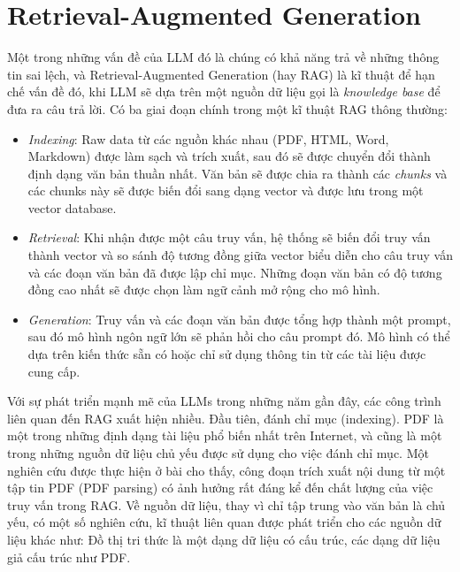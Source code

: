 \section{Retrieval-Augmented Generation}
Một trong những vấn đề của LLM đó là chúng có khả năng trả về những thông tin sai lệch, và
Retrieval-Augmented Generation (hay RAG) là kĩ thuật để hạn chế vấn đề đó, khi LLM sẽ dựa trên một nguồn dữ liệu gọi là \emph{knowledge base} để đưa ra câu trả lời. Có ba giai đoạn chính trong một kĩ thuật RAG\cite{gao2024retrievalaugmentedgenerationlargelanguage} thông thường:
\begin{itemize}
    \item \emph{Indexing}: Raw data từ các nguồn khác nhau (PDF, HTML, Word, Markdown) được làm sạch và trích xuất, sau đó sẽ được chuyển đổi thành định dạng văn bản thuần nhất. Văn bản sẽ được chia ra thành các \emph{chunks} và các chunks này sẽ được biến đổi sang dạng vector và được lưu trong một vector database.
    \item \emph{Retrieval}: Khi nhận được một câu truy vấn, hệ thống sẽ biến đổi truy vấn thành vector và so sánh độ tương đồng giữa vector biểu diễn cho câu truy vấn và các đoạn văn bản đã được lập chỉ mục. Những đoạn văn bản có độ tương đồng cao nhất sẽ được chọn làm ngữ cảnh mở rộng cho mô hình.
    \item \emph{Generation}: Truy vấn và các đoạn văn bản được tổng hợp thành một prompt, sau đó mô hình ngôn ngữ lớn sẽ phản hồi cho câu prompt đó. Mô hình có thể dựa trên kiến thức sẵn có hoặc chỉ sử dụng thông tin từ các tài liệu được cung cấp.
\end{itemize}
Với sự phát triển mạnh mẽ của LLMs trong những năm gần đây, các công trình liên quan đến RAG xuất hiện nhiều. Đầu tiên, đánh chỉ mục (indexing). PDF là một trong những định dạng tài liệu phổ biến nhất trên Internet, và cũng là một trong những nguồn dữ liệu chủ yếu được sử dụng cho việc đánh chỉ mục. Một nghiên cứu được thực hiện ở bài \cite{lin2024revolutionizingretrievalaugmentedgenerationenhanced} cho thấy, công đoạn trích xuất nội dung từ một tập tin PDF (PDF parsing) có ảnh hưởng rất đáng kể đến chất lượng của việc truy vấn trong RAG. Về nguồn dữ liệu, thay vì chỉ tập trung vào văn bản là chủ yếu, có một số nghiên cứu, kĩ thuật liên quan được phát triển cho các nguồn dữ liệu khác như: Đồ thị tri thức là một dạng dữ liệu có cấu trúc, các dạng dữ liệu giả cấu trúc như PDF\cite{gao2024retrievalaugmentedgenerationlargelanguage}.
